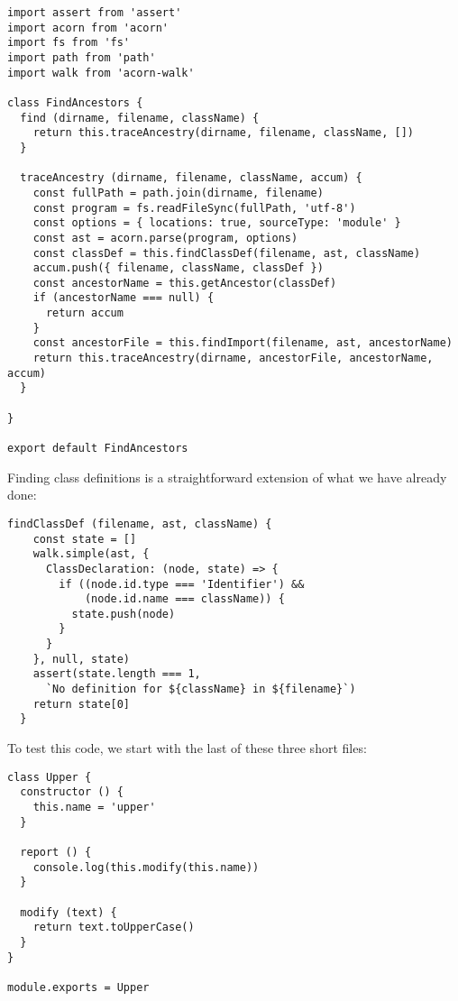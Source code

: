 \documentclass[krantzl]{krantz}
\begin{document}
\begin{lstlisting}[frame=single,frameround=tttt]
import assert from 'assert'
import acorn from 'acorn'
import fs from 'fs'
import path from 'path'
import walk from 'acorn-walk'

class FindAncestors {
  find (dirname, filename, className) {
    return this.traceAncestry(dirname, filename, className, [])
  }

  traceAncestry (dirname, filename, className, accum) {
    const fullPath = path.join(dirname, filename)
    const program = fs.readFileSync(fullPath, 'utf-8')
    const options = { locations: true, sourceType: 'module' }
    const ast = acorn.parse(program, options)
    const classDef = this.findClassDef(filename, ast, className)
    accum.push({ filename, className, classDef })
    const ancestorName = this.getAncestor(classDef)
    if (ancestorName === null) {
      return accum
    }
    const ancestorFile = this.findImport(filename, ast, ancestorName)
    return this.traceAncestry(dirname, ancestorFile, ancestorName, accum)
  }

}

export default FindAncestors
\end{lstlisting}



Finding class definitions is a straightforward extension of what we have already done:


\begin{lstlisting}[frame=single,frameround=tttt]
  findClassDef (filename, ast, className) {
    const state = []
    walk.simple(ast, {
      ClassDeclaration: (node, state) => {
        if ((node.id.type === 'Identifier') &&
            (node.id.name === className)) {
          state.push(node)
        }
      }
    }, null, state)
    assert(state.length === 1,
      `No definition for ${className} in ${filename}`)
    return state[0]
  }
\end{lstlisting}



To test this code, we start with the last of these three short files:


\begin{lstlisting}[frame=single,frameround=tttt]
class Upper {
  constructor () {
    this.name = 'upper'
  }

  report () {
    console.log(this.modify(this.name))
  }

  modify (text) {
    return text.toUpperCase()
  }
}

module.exports = Upper
\end{lstlisting}
\end{document}
